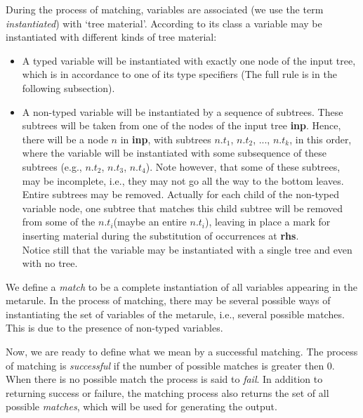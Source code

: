 During the process of matching, variables are associated (we use the 
term {\it instantiated}) with `tree material'.  According to its class 
a variable may be instantiated with different kinds of tree material: 
 
\begin{itemize} 
\item   A typed variable will be instantiated with exactly one node of 
        the input tree, which is in accordance to one of its type specifiers 
        (The full rule is in the following subsection). 
 
\item   A non-typed variable will be instantiated by a sequence of subtrees. 
        These subtrees will be taken from one of the nodes of the input tree 
        {\bf inp}. Hence, there will be a node $n$ in {\bf inp}, with subtrees 
        $n.t_1$, $n.t_2$, ..., $n.t_k$, in this order, where the variable 
        will be instantiated with some subsequence of these subtrees 
        (e.g., $n.t_2$, $n.t_3$, $n.t_4$). Note however, that some of these 
        subtrees, may be incomplete, i.e., they may not go all the way to the 
        bottom leaves. Entire subtrees may be removed. Actually for each 
        child of the non-typed variable node, one subtree that matches this 
        child subtree will be removed from some of the $n.t_i$(maybe an entire 
        $n.t_i$), leaving in place a mark for inserting material during the 
        substitution of occurrences at {\bf rhs}.\\ 
        Notice still that the variable may 
        be instantiated with a single tree and even with no tree. 
 
\end{itemize} 
 
We define a {\it match} to be a complete instantiation of all variables 
appearing in the metarule. In the process of matching, there may be several 
possible ways of instantiating the set of variables of the metarule, i.e., 
several possible matches. This is due to the presence of non-typed variables. 
 
Now, we are ready to define what we mean by a successful matching. The process 
of matching is {\it successful} 
if the number of possible matches is greater then 0. 
When there is no possible match the process is said to {\it fail}. 
In addition to returning success or failure, the 
matching process also returns the set of 
all possible {\it matches}, which will be used for generating the output. 
 
